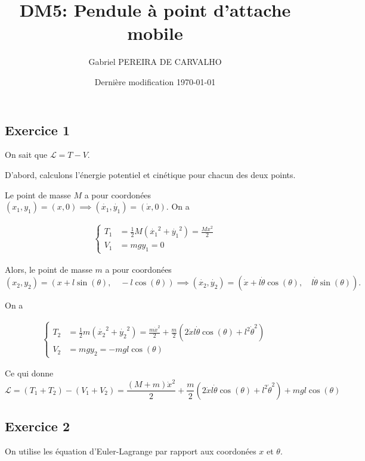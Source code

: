 \documentclass[french]{article}
\begin{document}
	\title{DM5:  Pendule à point d’attache mobile}
	\author{Gabriel PEREIRA DE CARVALHO}
	\date{Dernière modification \today}
	
	\maketitle
	
	\subsection*{Exercice 1}
	
	On sait que $\mathcal{L} = T - V$.
	
	D'abord, calculons l'énergie potentiel et cinétique pour chacun des deux points.
	
	Le point de masse $M$ a pour coordonées $(x_1, y_1) = (x, 0) \implies (\dot{x_1},\dot{y_1}) = (\dot{x}, 0)$. On a
	
	\begin{align}
		\begin{cases}
		T_1 &= \frac{1}{2} M (\dot{x_1}^2 + \dot{y_1}^2) = \frac{M x^2}{2}\\
		V_1 &= mgy_1 = 0
		\end{cases}
	\end{align}
	
	Alors, le point de masse $m$ a pour coordonées 
	$$ (x_2, y_2) = (x + l\sin(\theta),\quad -l\cos(\theta)) \implies (\dot{x_2}, \dot{y_2}) = (\dot{x} + l\dot{\theta}\cos(\theta),\quad l\dot{\theta}\sin(\theta)).$$
	
	On a
	
	\begin{align}
	\begin{cases}
	T_2 &= \frac{1}{2} m (\dot{x_2}^2 + \dot{y_2}^2) = \frac{m \dot{x}^2}{2} + \frac{m}{2}(2\dot{x}l\dot{\theta}\cos(\theta) + l^2\dot{\theta}^2)\\
	V_2 &= mgy_2 = -mgl\cos(\theta)
	\end{cases}
	\end{align}
	
	Ce qui donne 
	$$ \mathcal{L} = (T_1 + T_2) - (V_1 + V_2) =  \frac{(M+m)\dot{x}^2}{2} + \frac{m}{2}(2\dot{x}l\dot{\theta}\cos(\theta) + l^2\dot{\theta}^2) + mgl\cos(\theta)$$
	
	\subsection*{Exercice 2}
	
	On utilise les équation d'Euler-Lagrange par rapport aux coordonées $x$ et $\theta$.
	
\end{document}
